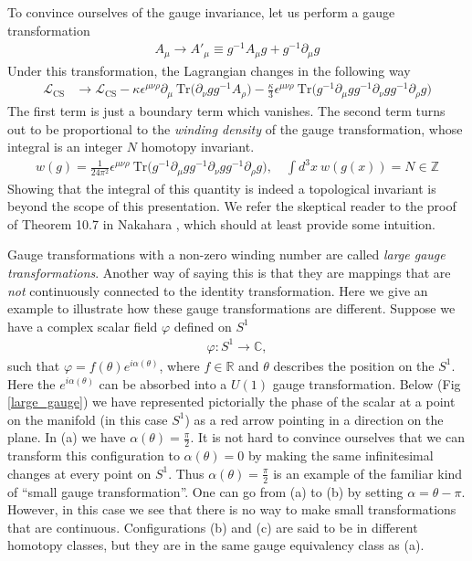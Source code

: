     To convince ourselves of the gauge invariance, let us perform a gauge transformation
    \begin{align}
        A_{\mu} \rightarrow A'_{\mu} \equiv g^{-1} A_{\mu} g + g^{-1}\partial_{\mu} g
    \end{align}
    Under this transformation, the Lagrangian changes in the following way
    \begin{align}
        \mathcal{L}_{\text{CS}} &\rightarrow \mathcal{L}_{\text{CS}}  - \kappa \epsilon^{\mu \nu \rho} \partial_{\mu} \ \mathrm{Tr} \bigg(\partial_{\nu} g g^{-1} A_{\rho}  \bigg) - \frac{\kappa}{3} \epsilon^{\mu \nu \rho} \ \mathrm{Tr} \bigg(g^{-1} \partial_{\mu} g g^{-1} \partial_{\nu} g g^{-1} \partial_{\rho} g\bigg)
    \end{align}
    The first term is just a boundary term which vanishes. The second term turns out to be proportional to the \textit{winding density} of the gauge transformation, whose integral is an integer $N$ homotopy invariant.
    \begin{align}
        w(g) = \frac{1}{24 \pi^2} \epsilon^{\mu \nu \rho} \ \mathrm{Tr} \bigg(g^{-1}\partial_{\mu} g g^{-1} \partial_{\nu} g g^{-1} \partial_{\rho} g \bigg), \quad \int d^3x \ w(g(x)) = N \in \mathbb{Z}
    \end{align}
    Showing that the integral of this quantity is indeed a topological invariant is beyond the scope of this presentation. We refer the skeptical reader to the proof of Theorem 10.7 in Nakahara \cite{Nakahara}, which should at least provide some intuition.

    Gauge transformations with a non-zero winding number are called \textit{large gauge transformations}. Another way of saying this is that they are mappings that are \textit{not} continuously connected to the identity transformation. Here we give an example to illustrate how these gauge transformations are different.
    Suppose we have a complex scalar field $\varphi$ defined on  $S^1$
    \begin{align}
        \varphi: S^1 \rightarrow \mathbb{C},
    \end{align}
    such that $\varphi = f(\theta) e^{i \alpha(\theta)}$, where $f\in \mathbb{R}$ and $\theta$ describes the position on the $S^1$. Here the $e ^{i \alpha (\theta)}$ can be absorbed into a $U(1)$ gauge transformation. Below (Fig \ref{large_gauge}) we have represented pictorially the phase of the scalar at a point on the manifold (in this case $S^1$) as a red arrow pointing in a direction on the plane. In (a) we have $\alpha(\theta) = \frac{\pi}{2}$. It is not hard to convince ourselves that we can transform this configuration to $\alpha(\theta) =0$ by making the same infinitesimal changes at every point on $S^1$. Thus $\alpha(\theta) = \frac{\pi}{2}$ is an example of the familiar kind of ``small gauge transformation''. One can go from (a) to (b) by setting $\alpha =\theta - \pi$. However, in this case we see that there is no way to make small transformations that are continuous. Configurations (b) and (c) are said to be in different homotopy classes, but they are in the same gauge equivalency class as (a).
    


